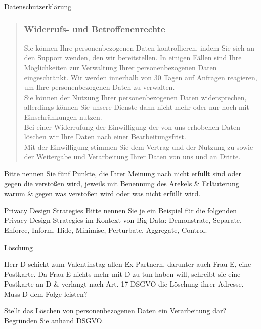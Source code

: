 \documentclass{exercisesheet}
\begin{document}
\begin{exercise*}{Datenschutzerklärung}
\begin{quote}
    \subsubsection*{Widerrufs- und Betroffenenrechte}
    Sie können Ihre personenbezogenen Daten kontrollieren, indem Sie sich an den Support wenden, den wir bereitstellen. In einigen Fällen sind Ihre Möglichkeiten zur Verwaltung Ihrer personenbezogenen Daten eingeschränkt. Wir werden innerhalb von 30 Tagen auf Anfragen reagieren, um Ihre personenbezogenen Daten zu verwalten.\\
    Sie können der Nutzung Ihrer personenbezogenen Daten widersprechen, allerdings können Sie unsere Dienste dann nicht mehr oder nur noch mit Einschränkungen nutzen.\\
    Bei einer Widerrufung der Einwilligung der von uns erhobenen Daten löschen wir Ihre Daten nach einer Bearbeitungsfrist.
    \vspace{1em}\\
    Mit der Einwilligung stimmen Sie dem Vertrag und der Nutzung zu sowie der Weitergabe und Verarbeitung Ihrer Daten von uns und an Dritte.
  \end{quote}

  Bitte nennen Sie fünf Punkte, die Ihrer Meinung nach nicht erfüllt sind oder gegen die verstoßen wird, jeweils mit Benennung des Arekels \& Erläuterung warum \& gegen was verstoßen wird oder was nicht erfüllt wird.
\end{exercise*}

\begin{exercise*}{Privacy Design Strategies}
  Bitte nennen Sie je ein Beispiel für die folgenden Privacy Design Strategies im Kontext von Big Data: Demonstrate, Separate, Enforce, Inform, Hide, Minimise, Perturbate, Aggregate, Control.
\end{exercise*}

\begin{exercise}{Löschung}
  \item Herr D schickt zum Valentinstag allen Ex-Partnern, darunter auch Frau E, eine Postkarte. Da Frau E nichts mehr mit D zu tun haben will, schreibt sie eine Postkarte an D \& verlangt nach Art. 17 DSGVO die Löschung ihrer Adresse. Muss D dem Folge leisten?
  \item Stellt das Löschen von personenbezogenen Daten ein Verarbeitung dar? Begründen Sie anhand DSGVO.
\end{exercise}
\end{document}
